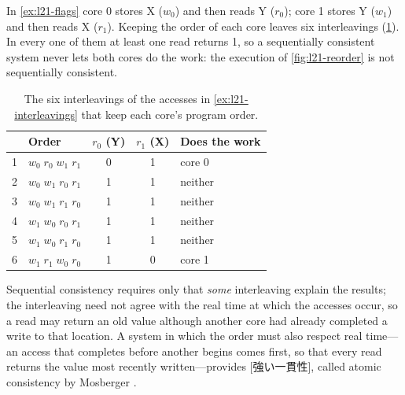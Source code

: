 \documentclass[../main.tex]{subfiles}
\begin{document}
\begin{example}
  \label{ex:l21-interleavings}
  In \cref{ex:l21-flags} core 0 stores X ($w_0$) and then reads Y ($r_0$);
  core 1 stores Y ($w_1$) and then reads X ($r_1$).  Keeping the order of each
  core leaves six interleavings (\cref{tab:l21-interleavings}).%
    In every one
  of them at least one read returns 1, so a sequentially consistent system
  never lets both cores do the work: the execution of \cref{fig:l21-reorder}
  is not sequentially consistent.
\end{example}

\begin{table}[htbp]
  \centering\small
  \caption{The six interleavings of the accesses in
    \cref{ex:l21-interleavings} that keep each core's program order.}
  \label{tab:l21-interleavings}
  \begin{tabular}{@{}clccl@{}}
    \toprule
    & Order & $r_0$ (Y) & $r_1$ (X) & Does the work \\
    \midrule
    1 & $w_0\;r_0\;w_1\;r_1$ & 0 & 1 & core 0 \\
    2 & $w_0\;w_1\;r_0\;r_1$ & 1 & 1 & neither \\
    3 & $w_0\;w_1\;r_1\;r_0$ & 1 & 1 & neither \\
    4 & $w_1\;w_0\;r_0\;r_1$ & 1 & 1 & neither \\
    5 & $w_1\;w_0\;r_1\;r_0$ & 1 & 1 & neither \\
    6 & $w_1\;r_1\;w_0\;r_0$ & 1 & 0 & core 1 \\
    \bottomrule
  \end{tabular}
\end{table}

\begin{note}
  Sequential consistency requires only that \emph{some} interleaving explain
  the results; the interleaving need not agree with the real time at which the
  accesses occur, so a read may return an old value although another core had
  already completed a write to that location.  A system in which the order
  must also respect real time---an access that completes before another begins
  comes first, so that every read returns the value most recently
  written---provides [強い一貫性], called atomic
  consistency by Mosberger \cite{mosberger1993}.
\end{note}
\end{document}
